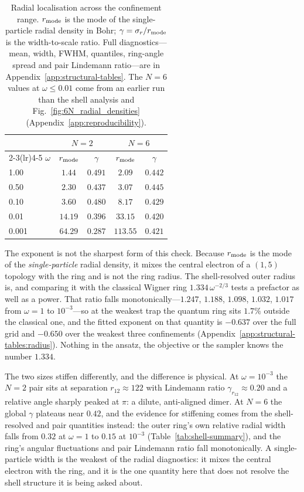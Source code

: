 \begin{table}[H]
\centering
\caption[Radial localisation across the confinement range]{Radial localisation across the confinement range. $r_{\rm mode}$ is the mode of
the single-particle radial density in Bohr; $\gamma=\sigma_r/r_{\rm mode}$ is the
width-to-scale ratio. Full diagnostics---mean, width, FWHM, quantiles, ring-angle spread
and pair Lindemann ratio---are in Appendix~\ref{app:structural-tables}. The $N{=}6$ values
at $\omega\le0.01$ come from an earlier run than the shell analysis and
Fig.~\ref{fig:6N_radial_densities} (Appendix~\ref{app:reproducibility}).}
\label{tab:radial-compact}
\begin{tabular}{lcccc}
\toprule
 & \multicolumn{2}{c}{$N{=}2$} & \multicolumn{2}{c}{$N{=}6$} \\
\cmidrule(lr){2-3}\cmidrule(lr){4-5}
$\omega$ & $r_{\rm mode}$ & $\gamma$ & $r_{\rm mode}$ & $\gamma$ \\
\midrule
1.00  & $1.44$  & $0.491$ & $2.09$   & $0.442$ \\
0.50  & $2.30$  & $0.437$ & $3.07$   & $0.445$ \\
0.10  & $3.60$  & $0.480$ & $8.17$   & $0.429$ \\
0.01  & $14.19$ & $0.396$ & $33.15$  & $0.420$ \\
0.001 & $64.29$ & $0.287$ & $113.55$ & $0.421$ \\
\bottomrule
\end{tabular}
\end{table}

The exponent is not the sharpest form of this check. Because $r_{\rm mode}$ is the mode of
the \emph{single-particle} radial density, it mixes the central electron of a $(1,5)$
topology with the ring and is not the ring radius. The shell-resolved outer radius is, and
comparing it with the classical Wigner ring $1.334\,\omega^{-2/3}$ tests a prefactor as
well as a power. That ratio falls monotonically---$1.247$, $1.188$, $1.098$, $1.032$,
$1.017$ from $\omega=1$ to $10^{-3}$---so at the weakest trap the quantum ring sits $1.7\%$
outside the classical one, and the fitted exponent on that quantity is $-0.637$ over the
full grid and $-0.650$ over the weakest three confinements
(Appendix~\ref{app:structural-tables:radius}). Nothing in the ansatz, the objective or the
sampler knows the number $1.334$.

The two sizes stiffen differently, and the difference is physical. At $\omega=10^{-3}$
the $N{=}2$ pair sits at separation $r_{12}\!\approx\!122$ with Lindemann ratio
$\gamma_{r_{12}}\!\approx\!0.20$ and a relative angle sharply peaked at $\pi$: a dilute,
anti-aligned dimer. At $N{=}6$ the global $\gamma$ plateaus near $0.42$, and the evidence
for stiffening comes from the shell-resolved and pair quantities instead: the outer ring's
own relative radial width falls from $0.32$ at $\omega=1$ to $0.15$ at $10^{-3}$
(Table~\ref{tab:shell-summary}), and the ring's angular fluctuations and pair Lindemann
ratio fall monotonically. A single-particle width is the weakest of the radial diagnostics:
it mixes the central electron with the ring, and it is the one quantity here that does not
resolve the shell structure it is being asked about.

